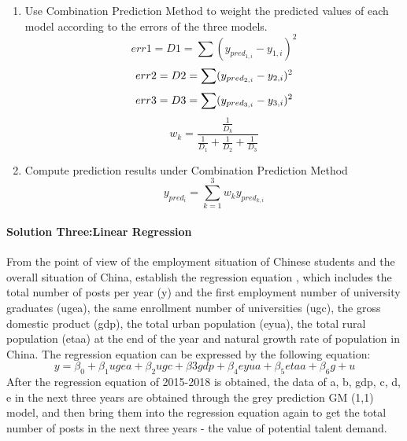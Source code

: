 \documentclass{mcmthesis}
\begin{document}
\begin{enumerate}
\begin{description}
	\end{description}
	\item Use Combination Prediction Method to weight the predicted values of each model according to the errors of the three models.
	\begin{equation}
	err1=D1=\sum(y_{pred_{1,i}}-y_{1,i})^2 
	\end{equation}
	\begin{equation}
	err2=D2=\sum(y_{pred_{2,i}}-y_{2,i})^2  \\
\end{equation}
\begin{equation}
	err3=D3=\sum(y_{pred_{3,i}}-y_{3,i})^2  \\
\end{equation}
\begin{equation}
	{w_k} = \frac{{\frac{1}{{{D_k}}}}}{{\frac{1}{{{D_1}}} + \frac{1}{{{D_2}}} + \frac{1}{{{D_3}}}}}
	\end{equation}
	\item Compute prediction results under Combination Prediction Method
	\begin{equation}
	y_{pred_i}=\sum\limits_{k = 1}^3 {{w_k}{y_{pre{d_{k,i}}}}} 
	\end{equation}
\end{enumerate}


\paragraph{Solution Three:Linear Regression}
\par\noindent
\par\noindent
From the point of view of the employment situation of Chinese students and the overall situation of China, establish the regression equation , which includes the total number of posts per year (y) and the first employment number of university graduates (ugea), the same enrollment number of universities (ugc), the gross domestic product (gdp), the total urban population (eyua), the total rural population (etaa) at the end of the year and natural growth rate of population in China. The regression equation can be expressed by the following equation:
\begin{equation}
y=\beta_0+\beta_1ugea+\beta_2ugc+\beta3gdp+\beta_4eyua+\beta_5etaa+\beta_6g+u
\end{equation}
	After the regression equation of 2015-2018 is obtained, the data of a, b, gdp, c, d, e in the next three years are obtained through the grey prediction GM (1,1) model, and then bring them into the regression equation again to get the total number of posts in the next three years - the value of potential talent demand.
\end{document}
